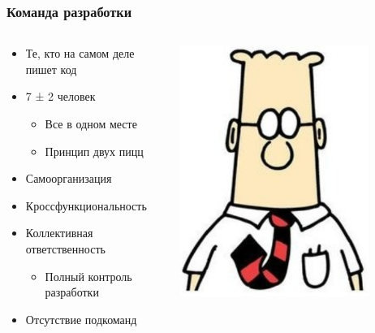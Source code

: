 \documentclass{../../slides-style}
\begin{document}
    \begin{frame}
        \frametitle{Команда разработки}
        \begin{columns}
            \begin{column}{0.7\textwidth}
                \begin{itemize}
                    \item Те, кто на самом деле пишет код
                    \item 7 ± 2 человек
                    \begin{itemize}
                        \item Все в одном месте
                        \item Принцип двух пицц
                    \end{itemize}
                    \item Самоорганизация
                    \item Кроссфункциональность
                    \item Коллективная ответственность
                    \begin{itemize}
                        \item Полный контроль разработки
                    \end{itemize}
                    \item Отсутствие подкоманд
                \end{itemize}
            \end{column}
            \begin{column}{0.3\textwidth}
                \strut
                \begin{center}
                    \includegraphics[width=0.8\textwidth]{vasyaZemlekop.png}
                \end{center}
            \end{column}
        \end{columns}
    \end{frame}
\end{document}
